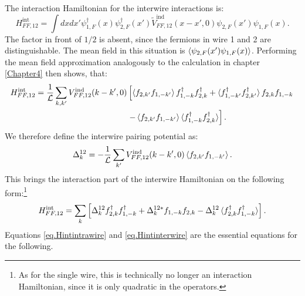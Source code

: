 The interaction Hamiltonian for the interwire interactions is:
\begin{equation}
H^\text{int}_{FF,12} = \int dx dx' \psi^\dagger_{1,F}(x)\psi^\dagger_{2,F}(x') \tilde{V}^\text{ind}_{FF,12}(x-x',0) \psi_{2,F}(x')\psi_{1,F}(x).
\end{equation}
The factor in front of $1/2$ is absent, since the fermions in wire 1 and 2 are distinguishable. The mean field in this situation is $\braket{\psi_{2,F}(x')\psi_{1,F}(x)}$. Performing the mean field approximation analogously to the calculation in chapter \ref{Chapter4} then shows, that:
\begin{align}
H^\text{int}_{FF,12} = \frac{1}{\mathcal{L}} \sum_{k,k'} V^\text{ind}_{FF,12}(k-k',0) & \left[\braket{f_{2,k'}f_{1,-k'}}f^\dagger_{1,-k}f^\dagger_{2,k} + \braket{f^\dagger_{1,-k'}f^\dagger_{2,k'}}f_{2,k}f_{1,-k} \right. \nonumber \\
& \left. - \braket{f_{2,k'}f_{1,-k'}}\braket{f^\dagger_{1,-k}f^\dagger_{2,k}} \right]. \nonumber
\end{align}
We therefore define the interwire pairing potential as:
\begin{equation}
\Delta^{12}_k = -\frac{1}{\mathcal{L}} \sum_{k'} V^\text{ind}_{FF,12}(k-k',0)\braket{f_{2,k'}f_{1,-k'}}.
\end{equation}
This brings the interaction part of the interwire Hamiltonian on the following form:\footnote{As for the single wire, this is technically no longer an interaction Hamiltonian, since it is only quadratic in the operators.}
\begin{equation}
H^\text{int}_{FF,12} = \sum_{k} \left[\Delta^{12}_k f^\dagger_{2,k}f^\dagger_{1,-k} + \Delta^{12 *}_k f_{1,-k}f_{2,k} - \Delta^{12}_k\braket{f^\dagger_{2,k}f^\dagger_{1,-k}} \right].
\label{eq.Hintinterwire}
\end{equation}
Equations \ref{eq.Hintintrawire} and \ref{eq.Hintinterwire} are the essential equations for the following. 

